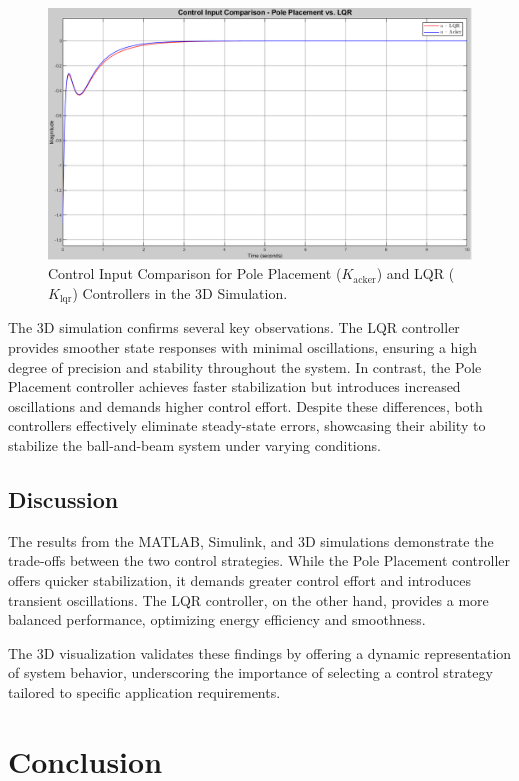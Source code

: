 \documentclass[conference]{IEEEtran}
\begin{document}
\begin{figure}[H]
    \centering
    \includegraphics[width=0.8\linewidth]{figures/control_input_compare.png}
    \caption{Control Input Comparison for Pole Placement (\(K_{\text{acker}}\)) and LQR (\(K_{\text{lqr}}\)) Controllers in the 3D Simulation.}
    \label{fig:control_input_compare}
\end{figure}

The 3D simulation confirms several key observations. The LQR controller provides smoother state responses with minimal oscillations, ensuring a high degree of precision and stability throughout the system. In contrast, the Pole Placement controller achieves faster stabilization but introduces increased oscillations and demands higher control effort. Despite these differences, both controllers effectively eliminate steady-state errors, showcasing their ability to stabilize the ball-and-beam system under varying conditions.

\subsection{Discussion}
The results from the MATLAB, Simulink, and 3D simulations demonstrate the trade-offs between the two control strategies. While the Pole Placement controller offers quicker stabilization, it demands greater control effort and introduces transient oscillations. The LQR controller, on the other hand, provides a more balanced performance, optimizing energy efficiency and smoothness. 

The 3D visualization validates these findings by offering a dynamic representation of system behavior, underscoring the importance of selecting a control strategy tailored to specific application requirements.


\section{Conclusion}
\label{sec:conclusion}
\end{document}
